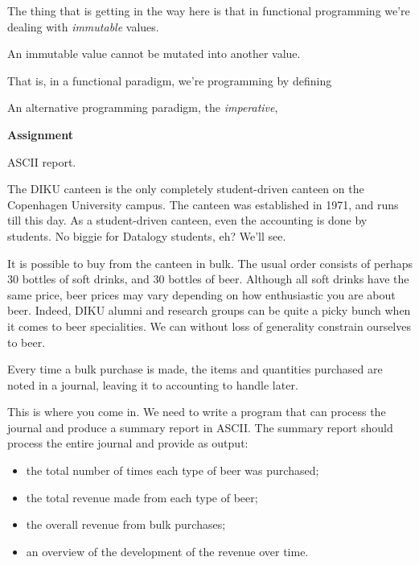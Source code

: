 The thing that is getting in the way here is that in functional programming
we're dealing with \emph{immutable} values.

\begin{definition}
An immutable value cannot be mutated into another value.
\end{definition}

That is, in a functional paradigm, we're programming by defining 

An alternative programming paradigm, the \emph{imperative}, 

{\bf Assignment}

ASCII report.

The DIKU canteen is the only completely student-driven canteen on the
Copenhagen University campus. The canteen was established in 1971, and runs
till this day. As a student-driven canteen, even the accounting is done by
students. No biggie for Datalogy students, eh? We'll see.

It is possible to buy from the canteen in bulk. The usual order consists of
perhaps 30 bottles of soft drinks, and 30 bottles of beer. Although all soft
drinks have the same price, beer prices may vary depending on how enthusiastic
you are about beer. Indeed, DIKU alumni and research groups can be quite a
picky bunch when it comes to beer specialities. We can without loss of
generality constrain ourselves to beer.

Every time a bulk purchase is made, the items and quantities purchased are
noted in a journal, leaving it to accounting to handle later.

This is where you come in. We need to write a program that can process the
journal and produce a summary report in ASCII. The summary report should
process the entire journal and provide as output:

\begin{itemize}

\item the total number of times each type of beer was purchased;

\item the total revenue made from each type of beer;

\item the overall revenue from bulk purchases;

\item an overview of the development of the revenue over time.

\end{itemize}

